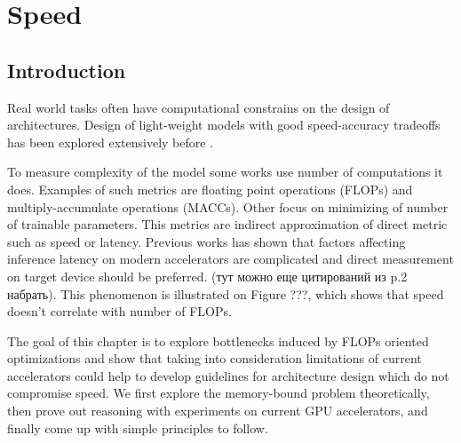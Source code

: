 \chapter{Speed} \label{chap:speed}



\section{Introduction}



Real world tasks often have computational constrains on the design of architectures. Design of light-weight models with good speed-accuracy tradeoffs has been explored extensively before \cite{howard2017_mobilenetv1} \cite{sandler2018_mobilenetv2} \cite{ma2018_shufflenetv2} \cite{zhang2018_shufflenet}.  %

To measure complexity of the model some works use number of computations it does. Examples of such metrics are floating point operations (FLOPs) and multiply-accumulate operations (MACCs). Other focus on minimizing of number of trainable parameters. This metrics are indirect approximation of direct metric such as speed or latency. Previous works has shown \cite{radosavovic2020_designing} \cite{lee2020_compounding_improvements} that factors affecting inference latency on modern accelerators are complicated and direct measurement on target device should be preferred. (тут можно еще цитирований из \cite{ma2018_shufflenetv2} p.2 набрать). This phenomenon is illustrated on Figure {???}, which shows that speed doesn't correlate with number of FLOPs.   

The goal of this chapter is to explore bottlenecks induced by FLOPs oriented optimizations and show that taking into consideration limitations of current accelerators could help to develop guidelines for architecture design which do not compromise speed. We first explore the memory-bound problem theoretically, then prove out reasoning with experiments on current GPU accelerators, and finally come up with simple principles to follow. 

